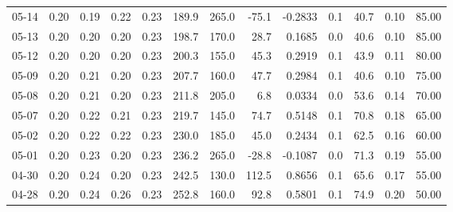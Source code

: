 \begin{threeparttable}
{\begin{tabular}{lrrrrrrrrrrrr}
  05-14 &          0.20 &          0.19 &          0.22 &        0.23 &               189.9 &               265.0 &      -75.1 &      -0.2833 &                 0.1 &             40.7 &            0.10 &                  85.00 \\
  05-13 &          0.20 &          0.20 &          0.20 &        0.23 &               198.7 &               170.0 &       28.7 &       0.1685 &                 0.0 &             40.6 &            0.10 &                  85.00 \\
  05-12 &          0.20 &          0.20 &          0.20 &        0.23 &               200.3 &               155.0 &       45.3 &       0.2919 &                 0.1 &             43.9 &            0.11 &                  80.00 \\
  05-09 &          0.20 &          0.21 &          0.20 &        0.23 &               207.7 &               160.0 &       47.7 &       0.2984 &                 0.1 &             40.6 &            0.10 &                  75.00 \\
  05-08 &          0.20 &          0.21 &          0.20 &        0.23 &               211.8 &               205.0 &        6.8 &       0.0334 &                 0.0 &             53.6 &            0.14 &                  70.00 \\
  05-07 &          0.20 &          0.22 &          0.21 &        0.23 &               219.7 &               145.0 &       74.7 &       0.5148 &                 0.1 &             70.8 &            0.18 &                  65.00 \\
  05-02 &          0.20 &          0.22 &          0.22 &        0.23 &               230.0 &               185.0 &       45.0 &       0.2434 &                 0.1 &             62.5 &            0.16 &                  60.00 \\
  05-01 &          0.20 &          0.23 &          0.20 &        0.23 &               236.2 &               265.0 &      -28.8 &      -0.1087 &                 0.0 &             71.3 &            0.19 &                  55.00 \\
  04-30 &          0.20 &          0.24 &          0.20 &        0.23 &               242.5 &               130.0 &      112.5 &       0.8656 &                 0.1 &             65.6 &            0.17 &                  55.00 \\
  04-28 &          0.20 &          0.24 &          0.26 &        0.23 &               252.8 &               160.0 &       92.8 &       0.5801 &                 0.1 &             74.9 &            0.20 &                  50.00 \\

\end{tabular}}
\end{threeparttable}
